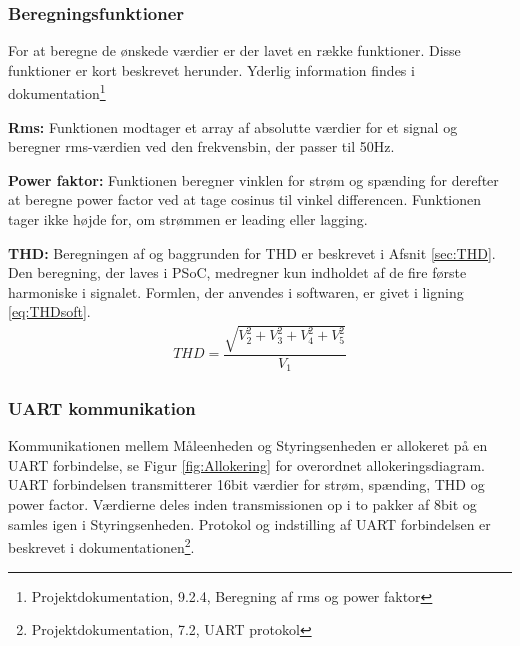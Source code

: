 
\subsubsection{Beregningsfunktioner}
For at beregne de ønskede værdier er der lavet en række funktioner. Disse funktioner er kort beskrevet herunder. Yderlig information findes i dokumentation\footnote{Projektdokumentation, 9.2.4, Beregning af rms og power faktor}

\textbf{Rms:}
Funktionen modtager et array af absolutte værdier for et signal og beregner rms-værdien ved den frekvensbin, der passer til 50Hz.

\textbf{Power faktor:}
Funktionen beregner vinklen for strøm og spænding for derefter at beregne power factor ved at tage cosinus til vinkel differencen. Funktionen tager ikke højde for, om strømmen er leading eller lagging.

\textbf{THD:}
Beregningen af og baggrunden for THD er beskrevet i Afsnit \ref{sec:THD}. Den beregning, der laves i PSoC, medregner kun indholdet af de fire første harmoniske i signalet. Formlen, der anvendes i softwaren, er givet i ligning \ref{eq:THDsoft}.
\begin{align}
\label{eq:THDsoft}
THD = \dfrac{\sqrt{V_2^{2}+V_3^{2}+V_4^{2}+V_5^{2}}}{V_{1}}
\end{align}
 

\subsubsection{UART kommunikation}
Kommunikationen mellem Måleenheden og Styringsenheden er allokeret på en UART forbindelse, se Figur \ref{fig:Allokering} for overordnet allokeringsdiagram. UART forbindelsen transmitterer 16bit værdier for strøm, spænding, THD og power factor. Værdierne deles inden transmissionen op i to pakker af 8bit og samles igen i Styringsenheden. Protokol og indstilling af UART forbindelsen er beskrevet i dokumentationen\footnote{Projektdokumentation, 7.2, UART protokol}.




